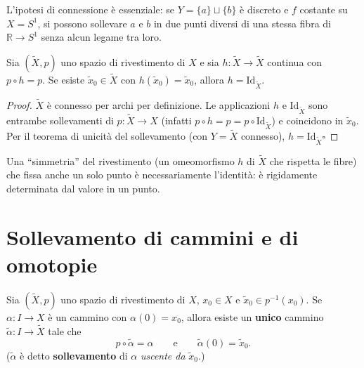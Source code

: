 \begin{observacion}
L'ipotesi di connessione \`e essenziale: se $Y = \{a\} \sqcup \{b\}$ \`e discreto e $f$ costante su $X = S^1$, si possono sollevare $a$ e $b$ in due punti diversi di una stessa fibra di $\mathbb{R} \to S^1$ senza alcun legame tra loro.
\end{observacion}


\begin{coro}
Sia $(\widetilde{X}, p)$ uno spazio di rivestimento di $X$ e sia $h: \widetilde{X} \to \widetilde{X}$ continua con $p \circ h = p$. Se esiste $\widetilde{x}_0 \in \widetilde{X}$ con $h(\widetilde{x}_0) = \widetilde{x}_0$, allora $h = \mathrm{Id}_{\widetilde{X}}$.
\end{coro}

\begin{proof}
$\widetilde{X}$ \`e connesso per archi per definizione. Le applicazioni $h$ e $\mathrm{Id}_{\widetilde{X}}$ sono entrambe sollevamenti di $p: \widetilde{X} \to X$ (infatti $p \circ h = p = p \circ \mathrm{Id}_{\widetilde{X}}$) e coincidono in $\widetilde{x}_0$. Per il teorema di unicit\`a del sollevamento (con $Y = \widetilde{X}$ connesso), $h = \mathrm{Id}_{\widetilde{X}}$\hfill$\square$
\end{proof}

\begin{intuizione}
Una ``simmetria'' del rivestimento (un omeomorfismo $h$ di $\widetilde{X}$ che rispetta le fibre) che fissa anche un solo punto \`e necessariamente l'identit\`a: \`e rigidamente determinata dal valore in un punto.
\end{intuizione}

\section{Sollevamento di cammini e di omotopie}

\begin{teo}
Sia $(\widetilde{X}, p)$ uno spazio di rivestimento di $X$, $x_0 \in X$ e $\widetilde{x}_0 \in p^{-1}(x_0)$. Se $\alpha: I \to X$ \`e un cammino con $\alpha(0) = x_0$, allora esiste un \textbf{unico} cammino $\widetilde{\alpha}: I \to \widetilde{X}$ tale che
\[
p \circ \widetilde{\alpha} = \alpha \qquad \text{e} \qquad \widetilde{\alpha}(0) = \widetilde{x}_0 .
\]
($\widetilde{\alpha}$ \`e detto \textbf{sollevamento} di $\alpha$ \emph{uscente da} $\widetilde{x}_0$.)
\end{teo}

